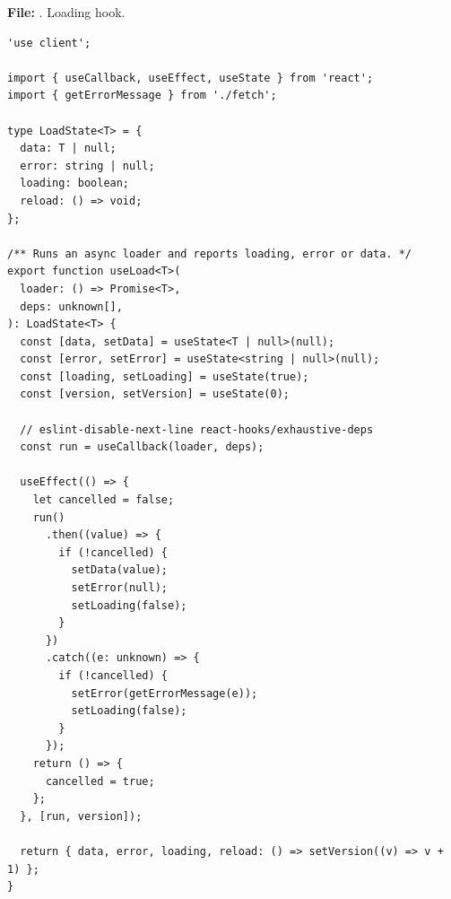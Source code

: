 \documentclass[11pt,a4paper]{article}
\begin{document}
\textbf{File:} . Loading hook.\par
\begin{lstlisting}
'use client';

import { useCallback, useEffect, useState } from 'react';
import { getErrorMessage } from './fetch';

type LoadState<T> = {
  data: T | null;
  error: string | null;
  loading: boolean;
  reload: () => void;
};

/** Runs an async loader and reports loading, error or data. */
export function useLoad<T>(
  loader: () => Promise<T>,
  deps: unknown[],
): LoadState<T> {
  const [data, setData] = useState<T | null>(null);
  const [error, setError] = useState<string | null>(null);
  const [loading, setLoading] = useState(true);
  const [version, setVersion] = useState(0);

  // eslint-disable-next-line react-hooks/exhaustive-deps
  const run = useCallback(loader, deps);

  useEffect(() => {
    let cancelled = false;
    run()
      .then((value) => {
        if (!cancelled) {
          setData(value);
          setError(null);
          setLoading(false);
        }
      })
      .catch((e: unknown) => {
        if (!cancelled) {
          setError(getErrorMessage(e));
          setLoading(false);
        }
      });
    return () => {
      cancelled = true;
    };
  }, [run, version]);

  return { data, error, loading, reload: () => setVersion((v) => v + 1) };
}
\end{lstlisting}
\end{document}
